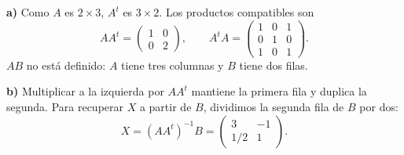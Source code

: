 \textbf{a)} Como $A$ es $2\times3$, $A^t$ es $3\times2$. Los productos compatibles son
\[
AA^t=\boxed{\begin{pmatrix}1&0\\0&2\end{pmatrix}},
\qquad
A^tA=\boxed{\begin{pmatrix}1&0&1\\0&1&0\\1&0&1\end{pmatrix}}.
\]
$AB$ no está definido: $A$ tiene tres columnas y $B$ tiene dos filas.

\textbf{b)} Multiplicar a la izquierda por $AA^t$ mantiene la primera fila y duplica la segunda. Para recuperar $X$ a partir de $B$, dividimos la segunda fila de $B$ por dos:
\[
X=(AA^t)^{-1}B=\boxed{\begin{pmatrix}3&-1\\1/2&1\end{pmatrix}}.
\]
